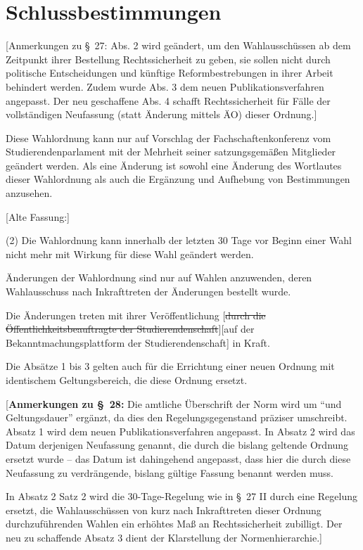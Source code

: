 \documentclass[%
draft,%
multilinesections%
]{fswo}
\newcommand\oldT[1]  {{\color{Gray}[\st{#1}]}}
\newcommand\newT[1]  {{\color{Green}[#1]}}
\newcommand\bemFr[1] {{\color{Red}[#1]}}
\newcommand\bemFe[1] {{\color{Cyan}[#1]}}
\newcommand\remark[1]{\begin{addmargin}{1cm}#1\end{addmargin}}
\newcommand\oldT[1]{}%
\newcommand\newT[1]{#1}
\newcommand\bemFr[1]{}%
\newcommand\bemFe[1]{}%
\newcommand\remark[1]{}
\newcommand\change[2]{\oldT{#1}\newT{#2}}
\begin{document}
\section{Schlussbestimmungen}
\bemFr{Anmerkungen zu \S~27: Abs. 2 wird geändert, um den Wahlausschüssen ab dem Zeitpunkt ihrer Bestellung Rechtssicherheit zu geben, sie sollen nicht durch politische Entscheidungen und künftige Reformbestrebungen in ihrer Arbeit behindert werden.
Zudem wurde Abs. 3 dem neuen Publikationsverfahren angepasst. Der neu geschaffene Abs. 4 schafft Rechtssicherheit für Fälle der vollständigen Neufassung (statt Änderung mittels ÄO) dieser Ordnung.}

\begin{contract}
Diese Wahlordnung kann nur auf Vorschlag der Fachschaftenkonferenz vom Studierendenparlament mit der Mehrheit seiner satzungsgemäßen Mitglieder geändert werden.
Als eine Änderung ist sowohl eine Änderung des Wortlautes dieser Wahlordnung als auch die Ergänzung und Aufhebung von Bestimmungen anzusehen.

\remark{%
\bemFe{Alte Fassung:}

\color{Gray}
(2) Die Wahlordnung kann innerhalb der letzten 30 Tage vor Beginn einer Wahl nicht mehr mit Wirkung für diese Wahl geändert werden.}

Änderungen der Wahlordnung sind nur auf Wahlen anzuwenden, deren Wahlausschuss nach Inkrafttreten der Änderungen bestellt wurde.

Die Änderungen treten mit ihrer Veröffentlichung
\change{durch die Öffentlichkeitsbeauftragte der Studierendenschaft}{auf der Bekanntmachungsplattform der Studierendenschaft} in Kraft.

Die Absätze 1 bis 3 gelten auch für die Errichtung einer neuen Ordnung mit identischem Geltungsbereich, die diese Ordnung ersetzt.
\end{contract}

\bemFr{\textbf{Anmerkungen zu \S~28:}
Die amtliche Überschrift der Norm wird um \enquote{und Geltungsdauer} ergänzt, da dies den Regelungsgegenstand präziser umschreibt.
Absatz 1 wird dem neuen Publikationsverfahren angepasst.
In Absatz 2 wird das Datum derjenigen Neufassung genannt, die durch die bislang geltende Ordnung ersetzt wurde –
das Datum ist dahingehend angepasst, dass hier die durch diese Neufassung zu verdrängende, bislang gültige Fassung benannt werden muss.

In Absatz 2 Satz 2 wird die 30-Tage-Regelung wie in \S~27 II durch eine Regelung ersetzt, die Wahlausschüssen von kurz nach Inkrafttreten dieser Ordnung durchzuführenden Wahlen ein erhöhtes Maß an Rechtssicherheit zubilligt. Der neu zu schaffende Absatz 3 dient der Klarstellung der Normenhierarchie.}
\end{document}
